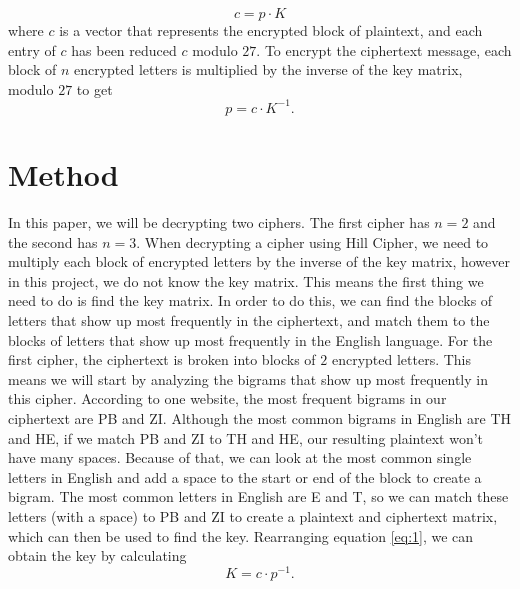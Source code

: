 \documentclass{article}
\begin{document}
\begin{equation} \label{eq:1}
    c = p \cdot K
\end{equation}
where $c$ is a vector that represents the encrypted block of plaintext, and each entry of $c$ has been reduced $c$ modulo $27$. To encrypt the ciphertext message, each block of $n$ encrypted letters is multiplied by the inverse of the key matrix, modulo $27$ to get 
\begin{equation}
    p = c \cdot K^{-1}.
\end{equation}


\section{Method}

In this paper, we will be decrypting two ciphers. The first cipher has $n=2$ and the second has $n=3$. When decrypting a cipher using Hill Cipher, we need to multiply each block of encrypted letters by the inverse of the key matrix, however in this project, we do not know the key matrix. This means the first thing we need to do is find the key matrix. In order to do this, we can find the blocks of letters that show up most frequently in the ciphertext, and match them to the blocks of letters that show up most frequently in the English language. For the first cipher, the ciphertext is broken into blocks of $2$ encrypted letters. This means we will start by analyzing the bigrams that show up most frequently in this cipher. According to one website, the most frequent bigrams in our ciphertext are PB and ZI. \cite{edu} Although the most common bigrams in English are TH and HE, if we match PB and ZI to TH and HE, our resulting plaintext won't have many spaces. Because of that, we can look at the most common single letters in English and add a space to the start or end of the block to create a bigram. The most common letters in English are E and T, so we can match these letters (with a space) to PB and ZI to create a plaintext and ciphertext matrix, which can then be used to find the key. Rearranging equation \eqref{eq:1}, we can obtain the key by calculating
\begin{equation}
    K = c \cdot p^{-1}.
\end{equation}
\end{document}
